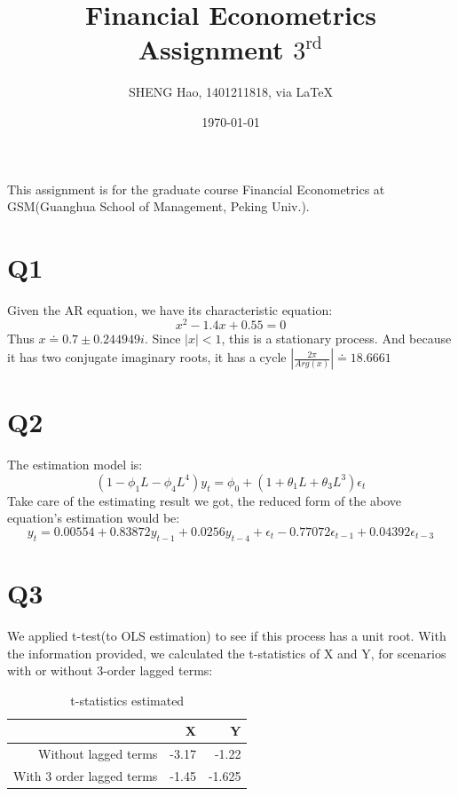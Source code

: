 \documentclass{article}
\begin{document}
\title{Financial Econometrics\\Assignment $3^{\text{rd}}$}
\author{{\normalsize SHENG Hao, 1401211818, via \LaTeX}}
\date{\today}

\maketitle

\def \Pr{{\rm Pr}}
\baselineskip 0.6cm

 This assignment is for the graduate course Financial Econometrics at GSM(Guanghua School of Management, Peking Univ.). 


\section{Q1}
Given the AR equation, we have its characteristic equation:
\begin{equation}
  x^2-1.4x+0.55=0
\end{equation}
Thus $x \doteq 0.7\pm0.244949 i$.
Since $|x|<1$, this is a stationary process. And because it has two conjugate imaginary roots, it has a cycle $|\frac{2 \pi} {Arg(x)}| \doteq 18.6661$


\section{Q2}
The estimation model is:
\begin{equation}
  (1-\phi_1 L - \phi_4 L^4)y_t = \phi_0 + (1+\theta_1 L + \theta_3 L^3)\epsilon_t
\end{equation}
Take care of the estimating result we got, the reduced form of the above equation's estimation would be:
\begin{equation}
  y_t=0.00554+0.83872y_{t-1}+0.0256y_{t-4}+\epsilon_{t}-0.77072\epsilon_{t-1} +0.04392\epsilon_{t-3}
\end{equation}
\section{Q3}
We applied t-test(to OLS estimation) to see if this process has a unit root. With the information provided, we calculated the t-statistics of X and Y, for scenarios with or without 3-order lagged terms:
\begin{table}[!h]
\centering
\begin{tabular}{r|rr}

           &          X &          Y \\
\hline
\hline
Without lagged terms &      -3.17 &       -1.22 \\

With 3 order lagged terms &       -1.45 &      -1.625 \\
\hline
\end{tabular}  
\caption{t-statistics estimated}
\end{table}
\end{document}
